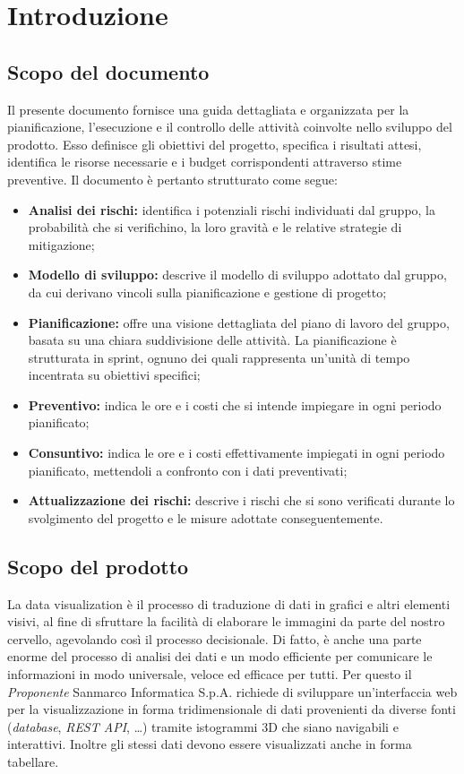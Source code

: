 \section{Introduzione}
\subsection{Scopo del documento}
Il presente documento fornisce una guida dettagliata e organizzata per la
pianificazione, l'esecuzione e il controllo delle attività coinvolte nello
sviluppo del prodotto. Esso definisce gli obiettivi del progetto, specifica i
risultati attesi, identifica le risorse necessarie e i budget corrispondenti
attraverso stime preventive. Il documento è pertanto strutturato come segue:
\begin{itemize}
      \item \textbf{Analisi dei rischi:} identifica i potenziali rischi individuati
            dal gruppo, la probabilità che si verifichino, la loro gravità e le relative
            strategie di mitigazione;
      \item \textbf{Modello di sviluppo:} descrive il modello di sviluppo adottato dal
            gruppo, da cui derivano vincoli sulla pianificazione e gestione di progetto;
      \item \textbf{Pianificazione:} offre una visione dettagliata del piano di lavoro
            del gruppo, basata su una chiara suddivisione delle attività. La pianificazione
            è strutturata in sprint, ognuno dei quali rappresenta un'unità di tempo
            incentrata su obiettivi specifici;
      \item \textbf{Preventivo:} indica le ore e i costi che si intende impiegare
            in ogni periodo pianificato;
      \item \textbf{Consuntivo:} indica le ore e i costi effettivamente impiegati
            in ogni periodo pianificato, mettendoli a confronto con i dati preventivati;
      \item \textbf{Attualizzazione dei rischi:} descrive i rischi che si sono verificati
            durante lo svolgimento del progetto e le misure adottate conseguentemente.
\end{itemize}

\subsection{Scopo del prodotto}
La data visualization è il processo di traduzione di dati in grafici e altri
elementi visivi, al fine di sfruttare la facilità di elaborare le immagini da
parte del nostro cervello, agevolando così il processo decisionale. Di fatto, è
anche una parte enorme del processo di analisi dei dati e un modo efficiente
per comunicare le informazioni in modo universale, veloce ed efficace per
tutti. Per questo il \textit{Proponente} Sanmarco Informatica S.p.A. richiede
di sviluppare un'interfaccia web per la visualizzazione in forma
tridimensionale di dati provenienti da diverse fonti (\textit{database},
\textit{REST API}, \dots) tramite istogrammi 3D che siano navigabili e
interattivi. Inoltre gli stessi dati devono essere visualizzati anche in forma
tabellare.
